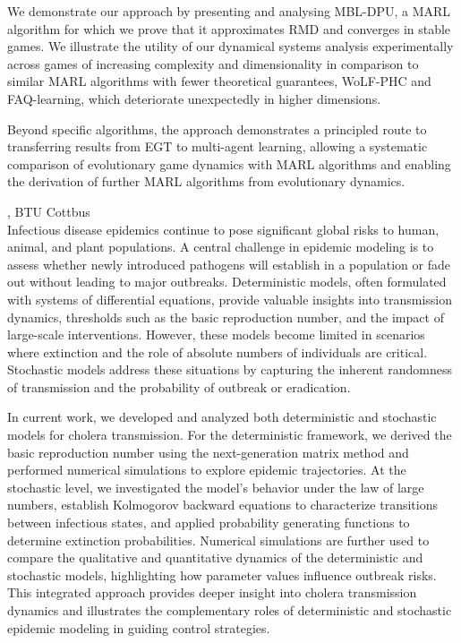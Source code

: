 \documentclass[12pt,a4paper]{article}
\begin{document}
 We demonstrate our approach by presenting and analysing MBL-DPU, a MARL algorithm for which we prove that it approximates RMD and converges in stable games. We illustrate the utility of our dynamical systems analysis experimentally across games of increasing complexity and dimensionality in comparison to similar MARL algorithms with fewer theoretical guarantees, WoLF-PHC and FAQ-learning, which deteriorate unexpectedly in higher dimensions. 

 Beyond specific algorithms, the approach demonstrates a principled route to transferring results from EGT to multi-agent learning, allowing a systematic comparison of evolutionary game dynamics with MARL algorithms and enabling the derivation of further MARL algorithms from evolutionary dynamics. 

\bigskip\bigskip

, BTU Cottbus \\[2ex] Infectious disease epidemics continue to pose significant global risks to human, animal, and plant populations. A central challenge in epidemic modeling is to assess whether newly introduced pathogens will establish in a population or fade out without leading to major outbreaks. Deterministic models, often formulated with systems of differential equations, provide valuable insights into transmission dynamics, thresholds such as the basic reproduction number, and the impact of large-scale interventions. However, these models become limited in scenarios where extinction and the role of absolute numbers of individuals are critical. Stochastic models address these situations by capturing the inherent randomness of transmission and the probability of outbreak or eradication. 

 In current work, we developed and analyzed both deterministic and stochastic models for cholera transmission. For the deterministic framework, we derived the basic reproduction number using the next-generation matrix method and performed numerical simulations to explore epidemic trajectories. At the stochastic level, we investigated the model's behavior under the law of large numbers, establish Kolmogorov backward equations to characterize transitions between infectious states, and applied probability generating functions to determine extinction probabilities. Numerical simulations are further used to compare the qualitative and quantitative dynamics of the deterministic and stochastic models, highlighting how parameter values influence outbreak risks. This integrated approach provides deeper insight into cholera transmission dynamics and illustrates the complementary roles of deterministic and stochastic epidemic modeling in guiding control strategies. 
\end{document}
